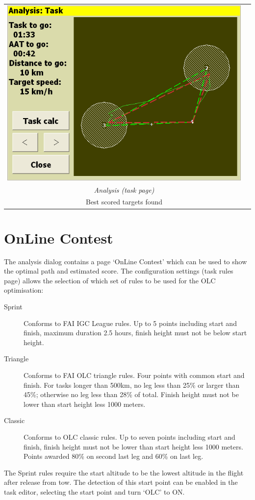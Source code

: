 \documentclass[a4paper,12pt]{refrep}
\begin{document}
\begin{maxipage}
\begin{center}
\begin{longtable}{|c|c|}
 \midrule

\includegraphics[angle=0,width=0.45\linewidth,keepaspectratio='true']{figures/faat12.png} &  \\
{\em Analysis (task page)} &  \\
Best scored targets found &  \\
\bottomrule
\end{longtable}
\end{center}
\end{maxipage}

\section{OnLine Contest}

  The analysis dialog contains a page `OnLine Contest' which can be
  used to show the optimal path and estimated score.  The
  configuration settings (task rules page) allows the selection of
  which set of rules to be used for the OLC optimisation:
\begin{description}
\item[Sprint] Conforms to FAI IGC League rules.  Up to 5 points including start and finish, maximum duration 2.5 hours, finish height must not be below start height.
\item[Triangle] Conforms to FAI OLC triangle rules.  Four points with common start and finish.  For tasks longer than 500km, no leg less than 25\% or larger than 45\%; otherwise no leg less than 28\% of total.  Finish height must not be lower than start height less 1000 meters.
\item[Classic] Conforms to OLC classic rules.  Up to seven points including start and finish, finish height must not be lower than start height less 1000 meters.  Points awarded 80\% on second last leg and 60\% on last leg.
\end{description}

  The Sprint rules require the start altitude to be the lowest
  altitude in the flight after release from tow.  The detection
  of this start point can be enabled in the task editor, selecting the
  start point and turn `OLC' to ON.
\end{document}
